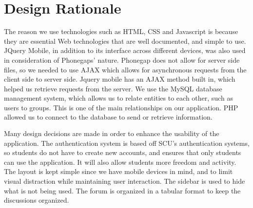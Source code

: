 \chapter{Design Rationale}
The reason we use technologies such as HTML, CSS and Javascript is because they are essential Web technologies that are well documented, and simple to use. JQuery Mobile, in addition to its interface across different devices, was also used in consideration of Phonegaps' nature. Phonegap does not allow for server side files, so we needed to use AJAX which allows for asynchronous requests from the client side to server side. Jquery mobile has an AJAX method  built in, which helped us retrieve requests from the server. We use the MySQL database management system, which allows us to relate entities to each other, such as users to groups. This is one of the main relationships on our application. PHP allowed us to connect to the database to send or retrieve information.

Many design decisions are made in order to enhance the usability of the application. The authentication system is based off SCU’s authentication systems, so students do not have to create new accounts, and ensures that only students can use the application. It will also allow students more freedom and activity. The layout is kept simple since we have mobile devices in mind, and to limit visual distraction while maintaining user interaction. The sidebar is used to hide what is not being used. The forum is organized in a tabular format to keep the discussions organized.